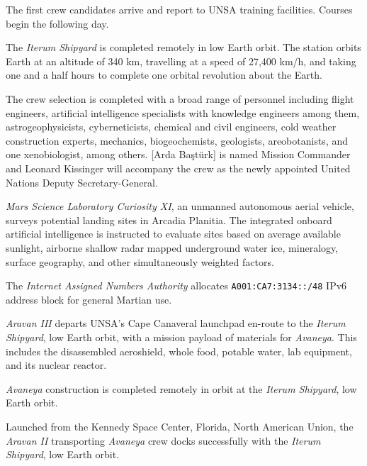 The first crew candidates arrive and report to UNSA training facilities. Courses begin the following day.
\StopTimelineDate

The {\it Iterum Shipyard} is completed remotely in low Earth orbit. The station orbits Earth at an altitude of 340 km, travelling at a speed of 27,400 km/h, and taking one and a half hours to complete one orbital revolution about the Earth.
\StopTimelineDate

The crew selection is completed with a broad range of personnel including flight engineers, artificial intelligence specialists with knowledge engineers among them, astrogeophysicists, cyberneticists, chemical and civil engineers, cold weather construction experts, mechanics, biogeochemists, geologists, areobotanists, and one xenobiologist, among others. [Arda Baştürk] is named Mission Commander and Leonard Kissinger will accompany the crew as the newly appointed United Nations Deputy Secretary-General.
\StopTimelineDate

{\it Mars Science Laboratory Curiosity XI}, an unmanned autonomous aerial vehicle, surveys potential landing sites in Arcadia Planitia. The integrated onboard artificial intelligence is instructed to evaluate sites based on average available sunlight, airborne shallow radar mapped underground water ice, mineralogy, surface geography, and other simultaneously weighted factors.
\StopTimelineDate

The {\it Internet Assigned Numbers Authority} allocates {\tt A001:CA7:3134::/48} IPv6 address block for general Martian use. 
\StopTimelineDate

{\it Aravan III} departs UNSA's Cape Canaveral launchpad en-route to the {\it Iterum Shipyard}, low Earth orbit, with a mission payload of materials for {\it Avaneya}. This includes the disassembled aeroshield, whole food, potable water, lab equipment, and its nuclear reactor.
\StopTimelineDate

{\it Avaneya} construction is completed remotely in orbit at the {\it Iterum Shipyard}, low Earth orbit.
\StopTimelineDate

Launched from the Kennedy Space Center, Florida, North American Union, the {\it Aravan II} transporting {\it Avaneya} crew docks successfully with the {\it Iterum Shipyard}, low Earth orbit.
\StopTimelineDate

